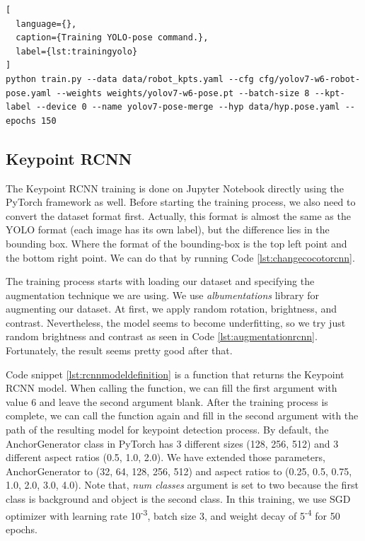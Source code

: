 \begin{lstlisting}[
  language={},
  caption={Training YOLO-pose command.},
  label={lst:trainingyolo}
]
python train.py --data data/robot_kpts.yaml --cfg cfg/yolov7-w6-robot-pose.yaml --weights weights/yolov7-w6-pose.pt --batch-size 8 --kpt-label --device 0 --name yolov7-pose-merge --hyp data/hyp.pose.yaml --epochs 150
\end{lstlisting}

\subsection{Keypoint RCNN}
\label{subsec:trainingrcnn}

The Keypoint RCNN training is done on Jupyter Notebook directly using the PyTorch framework as well.
Before starting the training process, we also need to convert the dataset format first.
Actually, this format is almost the same as the YOLO format (each image has its own label), but the difference lies in the bounding box.
Where the format of the bounding-box is the top left point and the bottom right point. We can do that by running Code \ref{lst:changecocotorcnn}.



The training process starts with loading our dataset and specifying the augmentation technique we are using. We use \emph{albumentations} library for augmenting our dataset.
At first, we apply random rotation, brightness, and contrast. Nevertheless, the model seems to become underfitting, so we try just random brightness and contrast as seen in Code \ref{lst:augmentationrcnn}. 
Fortunately, the result seems pretty good after that.



Code snippet \ref{lst:rcnnmodeldefinition} is a function that returns the Keypoint RCNN model.
When calling the function, we can fill the first argument with value 6
and leave the second argument blank. After the training process is complete, we can call the function again and fill in the second argument with the path of the resulting model for keypoint detection process.
By default, the AnchorGenerator class in PyTorch has 3 different sizes (128, 256, 512) and 3 different aspect ratios (0.5, 1.0, 2.0).
We have extended those parameters, AnchorGenerator to (32, 64, 128, 256, 512) and aspect ratios to (0.25, 0.5, 0.75, 1.0, 2.0, 3.0, 4.0).
Note that, \emph{num classes} argument is set to two because the first class is background and object is the second class.
In this training, we use SGD optimizer with learning rate 10\textsuperscript{-3}, batch size 3, and weight decay of 5\textsuperscript{-4} for 50 epochs.

